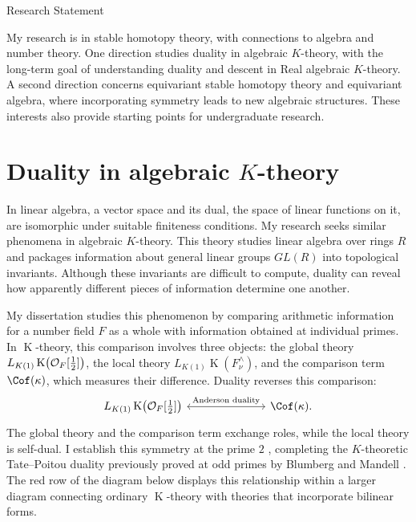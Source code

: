 \documentclass[10pt]{article}
\author{Myungsin Cho}
\date{}
\newcommand{\K}{\operatorname{K}}
\begin{document}
\begin{center}\LARGE{Research Statement}\end{center}\vspace{.5em}
My research is in stable homotopy theory, with connections to algebra and number theory.
One direction studies duality in algebraic $K$-theory, with the long-term goal of understanding duality and descent in Real algebraic $K$-theory.
A second direction concerns equivariant stable homotopy theory and equivariant algebra, where incorporating symmetry leads to new algebraic structures.
These interests also provide starting points for undergraduate research.

\section*{Duality in algebraic $K$-theory}
In linear algebra, a vector space and its dual, the space of linear functions on it, are isomorphic under suitable finiteness conditions.
My research seeks similar phenomena in algebraic $K$-theory.
This theory studies linear algebra over rings $R$ and packages information about general linear groups $GL(R)$ into topological invariants. 
Although these invariants are difficult to compute, duality can reveal how apparently different pieces of information determine one another.

My dissertation studies this phenomenon by comparing arithmetic information for a number field $F$ as a whole with information obtained at individual primes.
In $\K$-theory, this comparison involves three objects: the global theory $L_{K(1)}\K\bigl(\calO_F[\tfrac12]\bigr)$, the local theory $L_{K(1)}\K(F_\nu^\wedge)$, and the comparison term $\Cof(\kappa)$, which measures their difference.
Duality reverses this comparison:
\[
\begin{tikzcd}[column sep=7em]
L_{K(1)}\K\bigl(\calO_F[\tfrac12]\bigr)
\arrow[r, leftrightarrow, "\text{Anderson duality}"]
&
\Cof(\kappa).
\end{tikzcd}
\]
The global theory and the comparison term exchange roles, while the local theory is self-dual.
I establish this symmetry at the prime $2$ \cite{Cho}, completing the $K$-theoretic Tate--Poitou duality previously proved at odd primes by Blumberg and Mandell \cite{MR4121155}.
The red row of the diagram below displays this relationship within a larger diagram connecting ordinary $\K$-theory with theories that incorporate bilinear forms.
\end{document}
